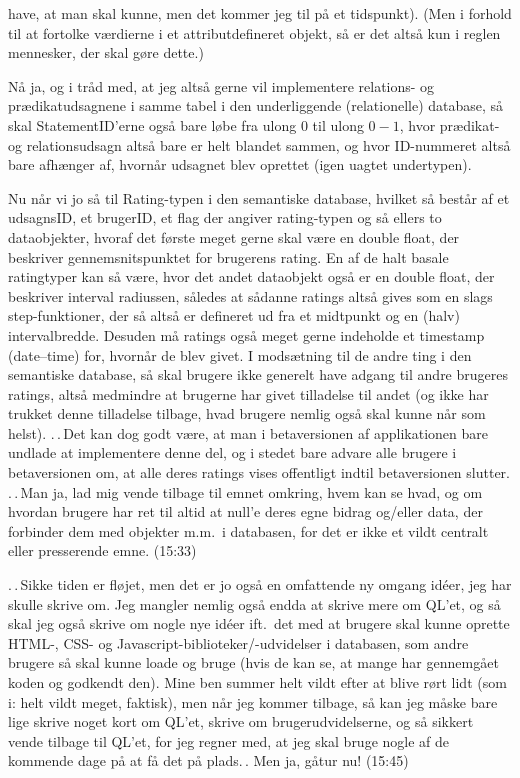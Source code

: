 \documentclass{report}
\begin{document}
have, at man skal kunne, men det kommer jeg til på et tidspunkt). (Men i forhold til at fortolke værdierne i et attributdefineret objekt, så er det altså kun i reglen mennesker, der skal gøre dette.) 

Nå ja, og i tråd med, at jeg altså gerne vil implementere relations- og prædikatudsagnene i samme tabel i den underliggende (relationelle) database, så skal StatementID'erne også bare løbe fra ulong 0 til ulong $0 - 1$, hvor prædikat- og relationsudsagn altså bare er helt blandet sammen, og hvor ID-nummeret altså bare afhænger af, hvornår udsagnet blev oprettet (igen uagtet undertypen). 

Nu når vi jo så til Rating-typen i den semantiske database, hvilket så består af et udsagnsID, et brugerID, et flag der angiver rating-typen og så ellers to dataobjekter, hvoraf det første meget gerne skal være en double float, der beskriver gennemsnitspunktet for brugerens rating. En af de halt basale ratingtyper kan så være, hvor det andet dataobjekt også er en double float, der beskriver interval radiussen, således at sådanne ratings altså gives som en slags step-funktioner, der så altså er defineret ud fra et midtpunkt og en (halv) intervalbredde. Desuden må ratings også meget gerne indeholde et timestamp (date--time) for, hvornår de blev givet. I modsætning til de andre ting i den semantiske database, så skal brugere ikke generelt have adgang til andre brugeres ratings, altså medmindre at brugerne har givet tilladelse til andet (og ikke har trukket denne tilladelse tilbage, hvad brugere nemlig også skal kunne når som helst). .\,.\,Det kan dog godt være, at man i betaversionen af applikationen bare undlade at implementere denne del, og i stedet bare advare alle brugere i betaversionen om, at alle deres ratings vises offentligt indtil betaversionen slutter. .\,.\,Man ja, lad mig vende tilbage til emnet omkring, hvem kan se hvad, og om hvordan brugere har ret til altid at null'e deres egne bidrag og/eller data, der forbinder dem med objekter m.m.\ i databasen, for det er ikke et vildt centralt eller presserende emne. (15:33)

.\,.\,Sikke tiden er fløjet, men det er jo også en omfattende ny omgang idéer, jeg har skulle skrive om. Jeg mangler nemlig også endda at skrive mere om QL'et, og så skal jeg også skrive om nogle nye idéer ift.\ det med at brugere skal kunne oprette HTML-, CSS- og Javascript-biblioteker/-udvidelser i databasen, som andre brugere så skal kunne loade og bruge (hvis de kan se, at mange har gennemgået koden og godkendt den). Mine ben summer helt vildt efter at blive rørt lidt (som i: helt vildt meget, faktisk), men når jeg kommer tilbage, så kan jeg måske bare lige skrive noget kort om QL'et, skrive om brugerudvidelserne, og så sikkert vende tilbage til QL'et, for jeg regner med, at jeg skal bruge nogle af de kommende dage på at få det på plads.\,. Men ja, gåtur nu! (15:45)
\end{document}
